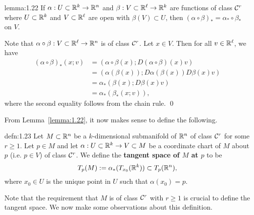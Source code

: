 \begin{lemma}{lemma:1.22}
    If $\alpha : U \subset \mathbb{R}^k \to \mathbb{R}^n$ and $\beta : V \subset \mathbb{R}^\ell 
    \to \mathbb{R}^k$ are functions of class ${\cal C}^r$ where $U \subset \mathbb{R}^k$ and $V 
    \subset \mathbb{R}^\ell$ are open with $\beta(V) \subset U$, then 
    $(\alpha \circ \beta)_* = \alpha_* \circ \beta_*$ on $V$. 
\end{lemma}\vspace{-0.25cm} 
\begin{pf}
    Note that $\alpha \circ \beta : V \subset \mathbb{R}^\ell \to \mathbb{R}^n$ is 
    of class ${\cal C}^r$. Let $x \in V$. Then for all $v \in \mathbb{R}^\ell$, we have 
    \begin{align*}
        (\alpha \circ \beta)_*(x; v) 
        &= (\alpha \circ \beta(x); D(\alpha \circ \beta)(x)v) \\ 
        &= (\alpha(\beta(x)); D\alpha(\beta(x))D\beta(x)v) \\ 
        &= \alpha_*(\beta(x); D\beta(x)v) \\ 
        &= \alpha_*(\beta_*(x; v)), 
    \end{align*} 
    where the second equality follows from the chain rule. \qed 
\end{pf}\vspace{-0.25cm}

From Lemma~\ref{lemma:1.22}, it now makes sense to define the following. 

\begin{defn}{defn:1.23}
    Let $M \subset \mathbb{R}^n$ be a $k$-dimensional submanifold of $\mathbb{R}^n$ 
    of class ${\cal C}^r$ for some $r \geq 1$. Let $p \in M$ and let $\alpha : 
    U \subset \mathbb{R}^k \to V \subset M$ be a coordinate chart of $M$ 
    about $p$ (i.e. $p \in V$) of class ${\cal C}^r$. We define the 
    {\bf tangent space of $M$ at $p$} to be 
    \[ T_p(M) := \alpha_*(T_{x_0}(\mathbb{R}^k)) \subset T_p(\mathbb{R}^n), \] 
    where $x_0 \in U$ is the unique point in $U$ such that $\alpha(x_0) = p$.  
\end{defn}\vspace{-0.25cm}

Note that the requirement that $M$ is of class ${\cal C}^r$ with $r \geq 1$ 
is crucial to define the tangent space. We now make some observations 
about this definition. 

